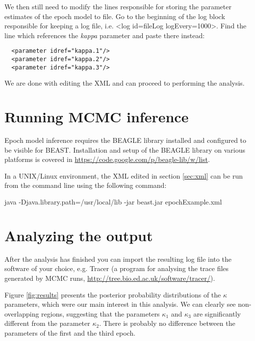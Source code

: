 \medskip{}

We then still need to modify the lines responsible for storing the parameter estimates of the epoch model to file.
Go to the beginning of the {\color{darkblue}log} block responsible for keeping a log file, i.e. <{\color{darkblue}log} {\color{darkblue}id}=\textquotedbl{}fileLog\textquotedbl{} {\color{darkblue}logEvery}=\textquotedbl{}1000\textquotedbl{}>.
Find the line which references the \textit{kappa} parameter and paste there instead:

\medskip{}

\begin{lstlisting}
  <parameter idref="kappa.1"/>
  <parameter idref="kappa.2"/>
  <parameter idref="kappa.3"/>
\end{lstlisting}

\medskip{}

We are done with editing the XML and can proceed to performing the analysis.

\section{Running MCMC inference}

Epoch model inference requires the BEAGLE library installed and configured to be visible for BEAST.
Installation and setup of the BEAGLE library on various platforms is covered in \url{https://code.google.com/p/beagle-lib/w/list}.

In a UNIX/Linux environment, the XML edited in section \ref{sec:xml} can be run from the command line using the following command:

\begin{code}
java -Djava.library.path=/usr/local/lib -jar beast.jar epochExample.xml
\end{code}

\section{Analyzing the output}

After the analysis has finished you can import the resulting log file into the software of your choice, e.g. Tracer (a program for analysing the trace files generated by MCMC runs, \url{http://tree.bio.ed.ac.uk/software/tracer/}).

Figure \ref{fig:results} presents the posterior probability distributions of the $\kappa$ parameters, which were our main interest in this analysis. 
We can clearly see non-overlapping regions, suggesting that the parameters $\kappa_1$ and $\kappa_3$ are significantly different from the parameter $\kappa_2$.
There is probably no difference between the parameters of the first and the third epoch.

